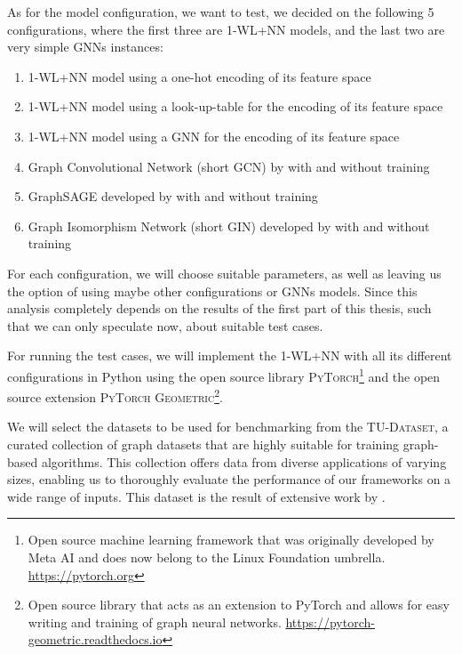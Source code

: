 \documentclass[11pt, dvipsnames, DIV=12]{scrreprt}
\theoremstyle{definition}
\begin{document}
As for the model configuration, we want to test, we decided on the following 5 configurations, where the first three are 1-WL+NN models, and the last two are very simple GNNs instances:
\begin{enumerate}
    \item 1-WL+NN model using a one-hot encoding of its feature space
    \item 1-WL+NN model using a look-up-table for the encoding of its feature space
    \item 1-WL+NN model using a GNN for the encoding of its feature space
    \item Graph Convolutional Network (short GCN) by \cite{Kip+2017} with and without training
    \item GraphSAGE developed by \cite{Ham+2017} with and without training
    \item Graph Isomorphism Network (short GIN) developed by \cite{Xu2018} with and without training
\end{enumerate}
For each configuration, we will choose suitable parameters, as well as leaving us the option of using maybe other configurations or GNNs models. Since this analysis completely depends on the results of the first part of this thesis, such that we can only speculate now, about suitable test cases.

For running the test cases, we will implement the 1-WL+NN with all its different configurations in Python using the open source library \textsc{PyTorch}\footnote{Open source machine learning framework that was originally developed by Meta AI and does now belong to the Linux Foundation umbrella. \href{https://pytorch.org}{https://pytorch.org}} and the open source extension \textsc{PyTorch Geometric}\footnote{Open source library that acts as an extension to PyTorch and allows for easy writing and training of graph neural networks. \href{https://pytorch-geometric.readthedocs.io/en/latest}{https://pytorch-geometric.readthedocs.io}}.

We will select the datasets to be used for benchmarking from the \textsc{TU-Dataset}, a curated collection of graph datasets that are highly suitable for training graph-based algorithms. This collection offers data from diverse applications of varying sizes, enabling us to thoroughly evaluate the performance of our frameworks on a wide range of inputs. This dataset is the result of extensive work by \cite{Mor+2020}.


\end{document}
